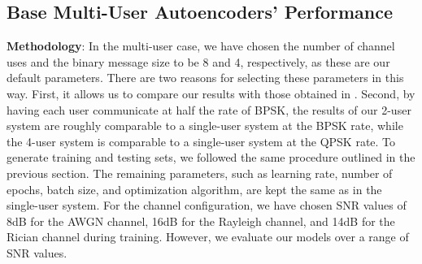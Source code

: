 \subsection{Base Multi-User Autoencoders' Performance}
\textbf{Methodology}: In the multi-user case, we have chosen the number of channel uses and the binary message size to be 8 and 4, respectively, as these are our default parameters. There are two reasons for selecting these parameters in this way. First, it allows us to compare our results with those obtained in \cite{o2017introduction}. Second, by having each user communicate at half the rate of BPSK, the results of our 2-user system are roughly comparable to a single-user system at the BPSK rate, while the 4-user system is comparable to a single-user system at the QPSK rate. To generate training and testing sets, we followed the same procedure outlined in the previous section. The remaining parameters, such as learning rate, number of epochs, batch size, and optimization algorithm, are kept the same as in the single-user system. For the channel configuration, we have chosen SNR values of 8dB for the AWGN channel, 16dB for the Rayleigh channel, and 14dB for the Rician channel during training. However, we evaluate our models over a range of SNR values.

